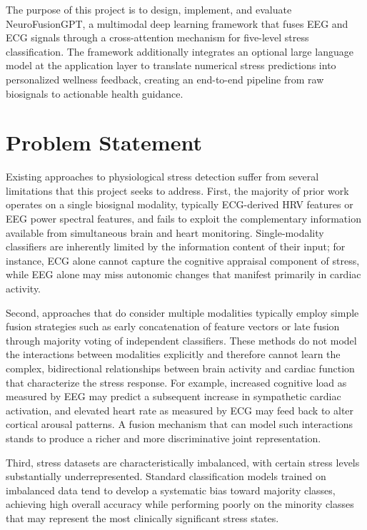 \documentclass[12pt,letterpaper]{report}
\begin{document}
The purpose of this project is to design, implement, and evaluate NeuroFusionGPT, a multimodal deep learning framework that fuses EEG and ECG signals through a cross-attention mechanism for five-level stress classification. The framework additionally integrates an optional large language model at the application layer to translate numerical stress predictions into personalized wellness feedback, creating an end-to-end pipeline from raw biosignals to actionable health guidance.

\section{Problem Statement}
\label{sec:problem}

Existing approaches to physiological stress detection suffer from several limitations that this project seeks to address. First, the majority of prior work operates on a single biosignal modality, typically ECG-derived HRV features or EEG power spectral features, and fails to exploit the complementary information available from simultaneous brain and heart monitoring. Single-modality classifiers are inherently limited by the information content of their input; for instance, ECG alone cannot capture the cognitive appraisal component of stress, while EEG alone may miss autonomic changes that manifest primarily in cardiac activity.

Second, approaches that do consider multiple modalities typically employ simple fusion strategies such as early concatenation of feature vectors or late fusion through majority voting of independent classifiers. These methods do not model the interactions between modalities explicitly and therefore cannot learn the complex, bidirectional relationships between brain activity and cardiac function that characterize the stress response. For example, increased cognitive load as measured by EEG may predict a subsequent increase in sympathetic cardiac activation, and elevated heart rate as measured by ECG may feed back to alter cortical arousal patterns. A fusion mechanism that can model such interactions stands to produce a richer and more discriminative joint representation.

Third, stress datasets are characteristically imbalanced, with certain stress levels substantially underrepresented. Standard classification models trained on imbalanced data tend to develop a systematic bias toward majority classes, achieving high overall accuracy while performing poorly on the minority classes that may represent the most clinically significant stress states.
\end{document}
